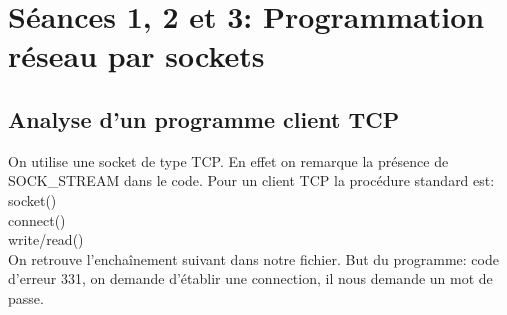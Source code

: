 \documentclass[paper=a4, fontsize=12pt]{article}
\numberwithin{equation}{section}		%
\numberwithin{figure}{section}			%
\numberwithin{table}{section}				%
\begin{document}
\section{Séances 1, 2 et 3: Programmation réseau par sockets}
\subsection{Analyse d'un programme client TCP}
On utilise une socket de type TCP. En effet on remarque la présence de SOCK\_STREAM dans le code. 
Pour un client TCP la procédure standard est:\\
socket()\\
connect()\\
write/read()\\
On retrouve l'enchaînement suivant dans notre fichier.
But du programme: code d'erreur 331, on demande d'établir une connection, il nous demande un mot de passe.
\end{document}
